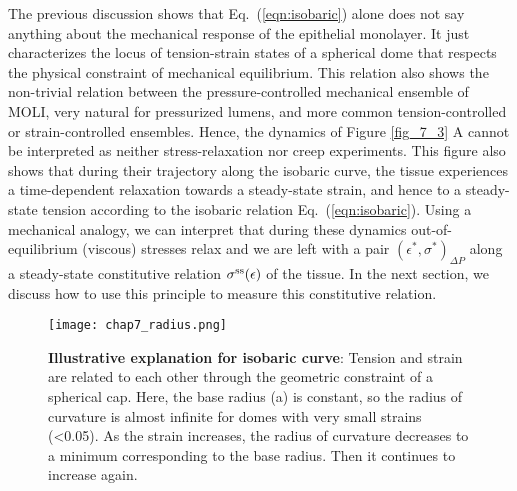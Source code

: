 The previous discussion shows that Eq.~(\ref{eqn:isobaric}) alone does not say anything about the mechanical response of the epithelial monolayer. It just characterizes the locus of tension-strain states of a spherical dome that respects the physical constraint of mechanical equilibrium. This relation also shows the non-trivial relation between the pressure-controlled mechanical ensemble of MOLI, very natural for pressurized lumens, and more common tension-controlled  or strain-controlled ensembles.
Hence, the dynamics of Figure \ref{fig_7_3} A cannot be interpreted as neither stress-relaxation nor creep experiments. This figure also shows that during their trajectory along the isobaric curve, the tissue experiences a time-dependent relaxation towards a steady-state strain, and hence to a steady-state tension according to the isobaric relation Eq.~(\ref{eqn:isobaric}). Using a mechanical analogy, we can interpret that during these dynamics out-of-equilibrium (viscous) stresses relax and we are left with a pair $(\epsilon^*, \sigma^*)_{\Delta P}$ along a steady-state constitutive relation $\sigma^{\rm ss}(\epsilon)$ of the tissue. In the next section, we discuss how to use this principle to measure this constitutive relation.



\begin{figure}
	\centering
	\texttt{[image: chap7\_radius.png]}
	\caption{\label{fig_7_4} \textbf{Illustrative explanation for isobaric curve}: Tension and strain are related to each other through the geometric constraint of a spherical cap. Here, the base radius (a) is constant, so the radius of curvature is almost infinite for domes with very small strains (<0.05). As the strain increases, the radius of curvature decreases to a minimum corresponding to the base radius. Then it continues to increase again.	
	}
\end{figure}

